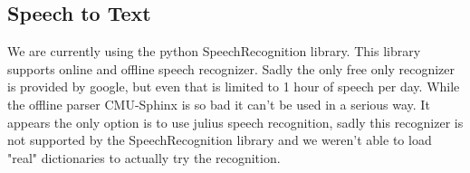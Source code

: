 \documentclass[main.tex]{subfiles}
\begin{document}
		\subsection{Speech to Text}
		We are currently using the python SpeechRecognition library. This library supports online and offline speech recognizer. Sadly the only free only recognizer is provided by google, but even that is limited to 1 hour of speech per day. While the offline parser CMU-Sphinx is so bad it can't be used in a serious way.
		It appears the only option is to use julius speech recognition, sadly this recognizer is not supported by the SpeechRecognition library and we weren't able to load "real" dictionaries to actually try the recognition.
	
\end{document}
